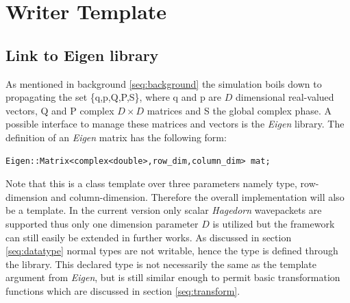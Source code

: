 \chapter{Writer Template}
\section{Link to Eigen library}
\label{seq:linkeigen}
As mentioned in background \ref{seq:background} the simulation boils down to propagating the set \{q,p,Q,P,S\}, where q and p are $D$ dimensional real-valued vectors, Q and P complex $D \times D$ matrices and S the global complex phase. A possible interface to manage these matrices and vectors is the \textit{Eigen} library. The definition of an \textit{Eigen} matrix has the following form:
\begin{lstlisting}
Eigen::Matrix<complex<double>,row_dim,column_dim> mat;
\end{lstlisting}
Note that this is a class template over three parameters namely type, row-dimension and column-dimension. Therefore the overall implementation will also be a template. In the current version only scalar \textit{Hagedorn} wavepackets are supported thus only one dimension parameter $D$ is utilized but the framework can still easily be extended in further works. As discussed in section \ref{seq:datatype} normal types are not writable, hence the type is defined through the library. This declared type is not necessarily the same as the template argument from \textit{Eigen}, but is still similar enough to permit basic transformation functions which are discussed in section \ref{seq:transform}.

